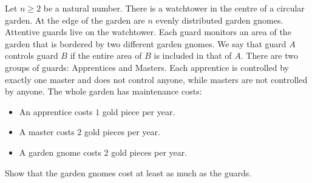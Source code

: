 Let $n \geq 2$ be a natural number. There is a watchtower in the centre of a circular garden.
At the edge of the garden are $n$ evenly distributed garden gnomes. Attentive guards live on the watchtower.
Each guard monitors an area of the garden that is bordered by two different garden gnomes.
We say that guard $A$ controls guard $B$ if the entire area of $B$ is included in that of $A$.
There are two groups of guards: Apprentices and Masters.
Each apprentice is controlled by exactly one master and does not control anyone,
while masters are not controlled by anyone. The whole garden has maintenance costs:
\begin{itemize}
    \item An apprentice costs $1$ gold piece per year.
    \item A master costs $2$ gold pieces per year.
    \item A garden gnome costs $2$ gold pieces per year.
\end{itemize}
Show that the garden gnomes cost at least as much as the guards.